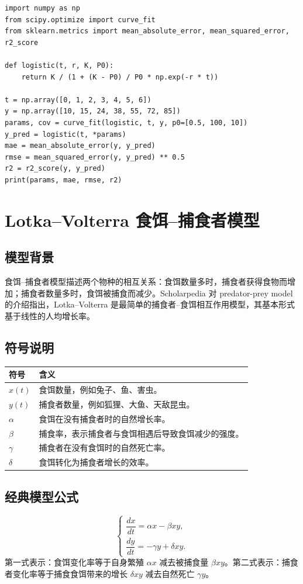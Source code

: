 \documentclass[11pt,a4paper]{ctexart}
\begin{document}
\begin{lstlisting}[style=pythonstyle,caption={Logistic 模型数值拟合的基本代码框架}]
import numpy as np
from scipy.optimize import curve_fit
from sklearn.metrics import mean_absolute_error, mean_squared_error, r2_score

def logistic(t, r, K, P0):
    return K / (1 + (K - P0) / P0 * np.exp(-r * t))

t = np.array([0, 1, 2, 3, 4, 5, 6])
y = np.array([10, 15, 24, 38, 55, 72, 85])
params, cov = curve_fit(logistic, t, y, p0=[0.5, 100, 10])
y_pred = logistic(t, *params)
mae = mean_absolute_error(y, y_pred)
rmse = mean_squared_error(y, y_pred) ** 0.5
r2 = r2_score(y, y_pred)
print(params, mae, rmse, r2)
\end{lstlisting}

\section{Lotka--Volterra 食饵--捕食者模型}

\subsection{模型背景}
食饵--捕食者模型描述两个物种的相互关系：食饵数量多时，捕食者获得食物而增加；捕食者数量多时，食饵被捕食而减少。Scholarpedia 对 predator-prey model 的介绍指出，Lotka--Volterra 是最简单的捕食者--食饵相互作用模型，其基本形式基于线性的人均增长率。

\subsection{符号说明}
\begin{longtable}{>{\centering\arraybackslash}p{2.2cm}p{10.8cm}}
\toprule
符号 & 含义 \\
\midrule
$x(t)$ & 食饵数量，例如兔子、鱼、害虫。\\
$y(t)$ & 捕食者数量，例如狐狸、大鱼、天敌昆虫。\\
$\alpha$ & 食饵在没有捕食者时的自然增长率。\\
$\beta$ & 捕食率，表示捕食者与食饵相遇后导致食饵减少的强度。\\
$\gamma$ & 捕食者在没有食饵时的自然死亡率。\\
$\delta$ & 食饵转化为捕食者增长的效率。\\
\bottomrule
\end{longtable}

\subsection{经典模型公式}
\[
\begin{cases}
\dfrac{dx}{dt}=\alpha x-\beta xy,\\[0.4em]
\dfrac{dy}{dt}=-\gamma y+\delta xy.
\end{cases}
\]
第一式表示：食饵变化率等于自身繁殖 $\alpha x$ 减去被捕食量 $\beta xy$。第二式表示：捕食者变化率等于捕食食饵带来的增长 $\delta xy$ 减去自然死亡 $\gamma y$。
\end{document}
